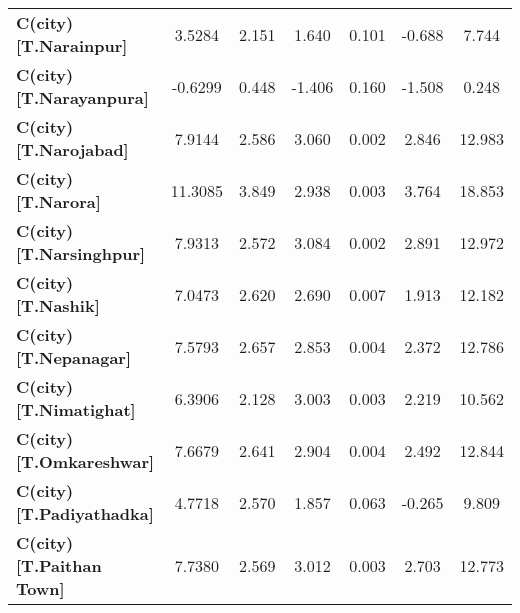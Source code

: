 \begin{center}
\begin{tabular}{lcccccc}
\textbf{C(city)[T.Narainpur]}                                                                       &       3.5284  &        2.151     &     1.640  &         0.101        &       -0.688    &        7.744     \\
\textbf{C(city)[T.Narayanpura]}                                                                     &      -0.6299  &        0.448     &    -1.406  &         0.160        &       -1.508    &        0.248     \\
\textbf{C(city)[T.Narojabad]}                                                                       &       7.9144  &        2.586     &     3.060  &         0.002        &        2.846    &       12.983     \\
\textbf{C(city)[T.Narora]}                                                                          &      11.3085  &        3.849     &     2.938  &         0.003        &        3.764    &       18.853     \\
\textbf{C(city)[T.Narsinghpur]}                                                                     &       7.9313  &        2.572     &     3.084  &         0.002        &        2.891    &       12.972     \\
\textbf{C(city)[T.Nashik]}                                                                          &       7.0473  &        2.620     &     2.690  &         0.007        &        1.913    &       12.182     \\
\textbf{C(city)[T.Nepanagar]}                                                                       &       7.5793  &        2.657     &     2.853  &         0.004        &        2.372    &       12.786     \\
\textbf{C(city)[T.Nimatighat]}                                                                      &       6.3906  &        2.128     &     3.003  &         0.003        &        2.219    &       10.562     \\
\textbf{C(city)[T.Omkareshwar]}                                                                     &       7.6679  &        2.641     &     2.904  &         0.004        &        2.492    &       12.844     \\
\textbf{C(city)[T.Padiyathadka]}                                                                    &       4.7718  &        2.570     &     1.857  &         0.063        &       -0.265    &        9.809     \\
\textbf{C(city)[T.Paithan Town]}                                                                    &       7.7380  &        2.569     &     3.012  &         0.003        &        2.703    &       12.773     \\

\end{tabular}
\end{center}

